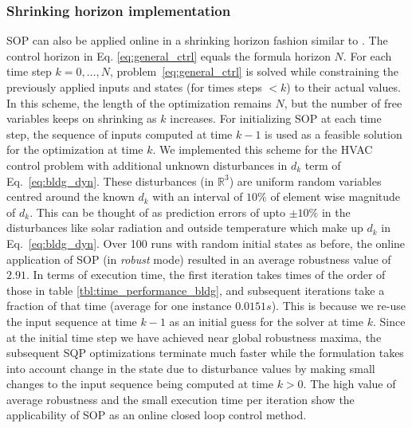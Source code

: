 \subsubsection{Shrinking horizon implementation} 
\label{sec:online}
SOP can also be applied online in a shrinking horizon fashion similar to \cite{Raman14_MPCSTL}. 
The control horizon in Eq. \eqref{eq:general_ctrl} equals the formula horizon $N$. %
For each time step $k=0,\dotsc,N$, problem~\eqref{eq:general_ctrl} is solved while constraining the previously applied inputs and states (for times steps $<k$) to their actual values. 
In this scheme, the length of the optimization remains $N$, but the number of free variables keeps on shrinking as $k$ increases. 
For initializing SOP at each time step, the sequence of inputs computed at time $k-1$ is used as a feasible solution for the optimization at time $k$. 
We implemented this scheme for the HVAC control problem with additional unknown disturbances in $d_k$ term of Eq.~\eqref{eq:bldg_dyn}.
These disturbances (in $\mathbb{R}^3$) are uniform random variables centred around the known $d_k$ with an interval of $10\%$ of element wise magnitude of $d_k$. This can be thought of as prediction errors of upto $\pm 10\%$ in the disturbances like solar radiation and outside temperature which make up $d_k$ in Eq.~\eqref{eq:bldg_dyn}. Over 100 runs with random initial states as before, the online application of SOP (in \textit{robust} mode) resulted in an average robustness value of $2.91$. In terms of execution time, the first iteration takes times of the order of those in table \ref{tbl:time_performance_bldg}, and subsequent iterations take a fraction of that time (average for one instance $0.0151s$). This is because we re-use the input sequence at time $k-1$ as an initial guess for the solver at time $k$. Since at the initial time step we have achieved near global robustness maxima, the subsequent SQP optimizations terminate much faster while the formulation takes into account change in the state due to disturbance values by making small changes to the input sequence being computed at time $k>0$. The high value of average robustness and the small execution time per iteration show the applicability of SOP as an online closed loop control method. 
